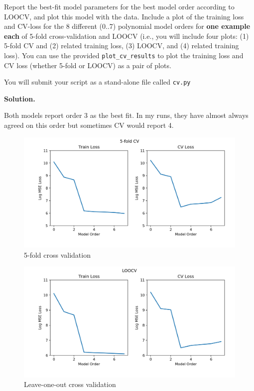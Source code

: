 \documentclass[10pt]{article}
\begin{document}
\begin{itemize}
Report the best-fit model parameters for the best model order according to LOOCV, and plot this model with the data.
Include a plot of the training loss and CV-loss for the 8 different (0..7) polynomial model orders for {\bf one example each} of 5-fold cross-validation and LOOCV (i.e., you will include four plots: (1) 5-fold CV and (2) related training loss, (3) LOOCV, and (4) related training loss).  You can use the provided {\tt plot\_cv\_results} to plot the training loss and CV loss (whether 5-fold or LOOCV) as a pair of plots.

You will submit your script as a stand-alone file called {\tt cv.py}

{\bf Solution.} 

Both models report order 3 as the best fit. In my runs, they have almost always agreed on this order but sometimes CV would report 4.

\begin{figure}[H]
\centering
  \includegraphics[width=\linewidth]{loss_5cv_o7_r1.png}
 \caption{5-fold cross validation}
\label{label}
\end{figure}

\begin{figure}[H]
\centering
  \includegraphics[width=\linewidth]{loss_loocv_o7_r1.png}
 \caption{Leave-one-out cross validation}
\label{label}
\end{figure}


\end{itemize}
\end{document}
